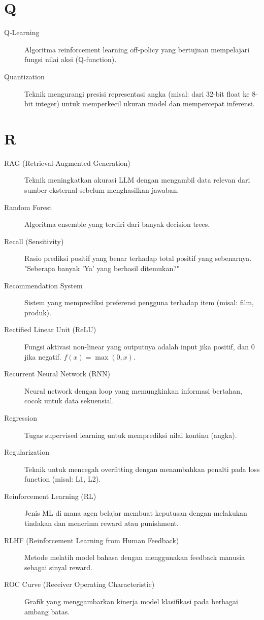 \section*{Q}
\begin{description}
    \item[Q-Learning] Algoritma reinforcement learning off-policy yang bertujuan mempelajari fungsi nilai aksi (Q-function).
    \item[Quantization] Teknik mengurangi presisi representasi angka (misal: dari 32-bit float ke 8-bit integer) untuk memperkecil ukuran model dan mempercepat inferensi.
\end{description}

\section*{R}
\begin{description}
    \item[RAG (Retrieval-Augmented Generation)] Teknik meningkatkan akurasi LLM dengan mengambil data relevan dari sumber eksternal sebelum menghasilkan jawaban.
    \item[Random Forest] Algoritma ensemble yang terdiri dari banyak decision trees.
    \item[Recall (Sensitivity)] Rasio prediksi positif yang benar terhadap total positif yang sebenarnya. "Seberapa banyak 'Ya' yang berhasil ditemukan?"
    \item[Recommendation System] Sistem yang memprediksi preferensi pengguna terhadap item (misal: film, produk).
    \item[Rectified Linear Unit (ReLU)] Fungsi aktivasi non-linear yang outputnya adalah input jika positif, dan 0 jika negatif. $f(x) = \max(0, x)$.
    \item[Recurrent Neural Network (RNN)] Neural network dengan loop yang memungkinkan informasi bertahan, cocok untuk data sekuensial.
    \item[Regression] Tugas supervised learning untuk memprediksi nilai kontinu (angka).
    \item[Regularization] Teknik untuk mencegah overfitting dengan menambahkan penalti pada loss function (misal: L1, L2).
    \item[Reinforcement Learning (RL)] Jenis ML di mana agen belajar membuat keputusan dengan melakukan tindakan dan menerima reward atau punishment.
    \item[RLHF (Reinforcement Learning from Human Feedback)] Metode melatih model bahasa dengan menggunakan feedback manusia sebagai sinyal reward.
    \item[ROC Curve (Receiver Operating Characteristic)] Grafik yang menggambarkan kinerja model klasifikasi pada berbagai ambang batas.
\end{description}

